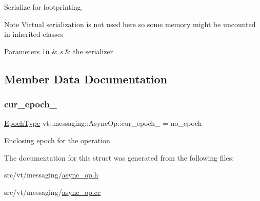 Serialize for footprinting. 

\begin{DoxyNote}{Note}
Virtual serialization is not used here so some memory might be uncounted in inherited classes
\end{DoxyNote}

\begin{DoxyParams}[1]{Parameters}
\mbox{\tt in}  & {\em s} & the serializer \\
\hline
\end{DoxyParams}


\subsection{Member Data Documentation}
\mbox{\label{structvt_1_1messaging_1_1_async_op_a19b64071b5b952c062139c9d1b1ce15b}} 
\subsubsection{\texorpdfstring{cur\+\_\+epoch\+\_\+}{cur\_epoch\_}}
{\footnotesize\ttfamily \hyperlink{namespacevt_a81d11b28122d43bf9834577e4a06440f}{Epoch\+Type} vt\+::messaging\+::\+Async\+Op\+::cur\+\_\+epoch\+\_\+ = no\+\_\+epoch\hspace{0.3cm}{\ttfamily [protected]}}

Enclosing epoch for the operation 

The documentation for this struct was generated from the following files\+:\begin{DoxyCompactItemize}
\item 
src/vt/messaging/\hyperlink{async__op_8h}{async\+\_\+op.\+h}\item 
src/vt/messaging/\hyperlink{async__op_8cc}{async\+\_\+op.\+cc}\end{DoxyCompactItemize}
